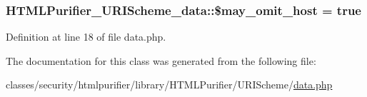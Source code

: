 \hypertarget{classHTMLPurifier__URIScheme__data_a34d953efd10dd8236b299aac1b4da60b}{
\subsubsection[{\$may\+\_\+omit\+\_\+host}]{\setlength{\rightskip}{0pt plus 5cm}H\+T\+M\+L\+Purifier\+\_\+\+U\+R\+I\+Scheme\+\_\+data\+::\$may\+\_\+omit\+\_\+host = true}}\label{classHTMLPurifier__URIScheme__data_a34d953efd10dd8236b299aac1b4da60b}


Definition at line 18 of file data.\+php.



The documentation for this class was generated from the following file\+:\begin{DoxyCompactItemize}
\item 
classes/security/htmlpurifier/library/\+H\+T\+M\+L\+Purifier/\+U\+R\+I\+Scheme/\hyperlink{data_8php}{data.\+php}\end{DoxyCompactItemize}
